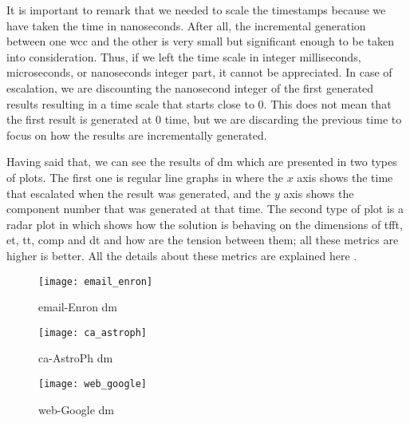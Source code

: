 It is important to remark that we needed to scale the timestamps because we have taken the time in nanoseconds. After all, the incremental generation between one \acrshort{wcc} and the other is very small but significant enough to be taken into consideration. 
Thus, if we left the time scale in integer milliseconds, microseconds, or nanoseconds integer part, it cannot be appreciated. In case of escalation, we are discounting the nanosecond integer of the first generated results resulting in a time scale that starts close to $0$. 
This does not mean that the first result is generated at $0$ time, but we are discarding the previous time to focus on how the results are incrementally generated.

Having said that, we can see the results of \acrshort{dm} which are presented in two types of plots. The first one is regular line graphs in where the $x$ axis shows the time that escalated when the result was generated, and the $y$ axis shows the component number that was generated at that time. 
The second type of plot is a radar plot in which shows how the solution is behaving 
on the dimensions of  \acrfull{tfft}, \acrfull{et}, \acrfull{tt}, \acrfull{comp} and \acrfull{dt} and how are the tension between them; all these metrics are higher is better. 
All the details about these metrics are explained here \cite{diefpaper}.

\begin{figure}[!htb]
    \centering
    \begin{minipage}{0.33\textwidth}
     \texttt{[image: email\_enron]}
      \caption[\acrshort{dm} Results: email-Enron]{email-Enron \acrshort{dm}}
      \label{fig:dief:1}
    \end{minipage}%
    \begin{minipage}{0.33\textwidth}
     \texttt{[image: ca\_astroph]}
      \caption[\acrshort{dm} Results: ca-AstroPh]{ca-AstroPh \acrshort{dm}}
      \label{fig:dief:2}
    \end{minipage}%
    \begin{minipage}{0.33\textwidth}
     \texttt{[image: web\_google]}
      \caption[\acrshort{dm} Results: web-Google]{web-Google \acrshort{dm}}
      \label{fig:dief:3}
    \end{minipage}
\end{figure}

